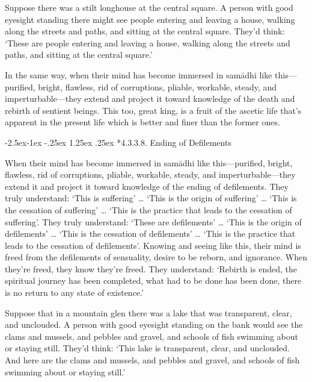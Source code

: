 \documentclass[12pt,openany]{book}%
\makeatletter
\renewcommand\paragraph{\@startsection{paragraph}{4}{\z@}%
            {-2.5ex\@plus -1ex \@minus -.25ex}%
            {1.25ex \@plus .25ex}%
            {\noindent\Semiboldnormalfont\normalsize}}
\makeatother
\begin{document}
Suppose there was a stilt longhouse at the central square. A person with good eyesight standing there might see people entering and leaving a house, walking along the streets and paths, and sitting at the central square. They’d think: ‘These are people entering and leaving a house, walking along the streets and paths, and sitting at the central square.’ 

In the same way, when their mind has become immersed in \textsanskrit{samādhi} like this—purified, bright, flawless, rid of corruptions, pliable, workable, steady, and imperturbable—they extend and project it toward knowledge of the death and rebirth of sentient beings. This too, great king, is a fruit of the ascetic life that’s apparent in the present life which is better and finer than the former ones. 

\paragraph*{4.3.3.8. Ending of Defilements }

When their mind has become immersed in \textsanskrit{samādhi} like this—purified, bright, flawless, rid of corruptions, pliable, workable, steady, and imperturbable—they extend it and project it toward knowledge of the ending of defilements. They truly understand: ‘This is suffering’ … ‘This is the origin of suffering’ … ‘This is the cessation of suffering’ … ‘This is the practice that leads to the cessation of suffering’. They truly understand: ‘These are defilements’ … ‘This is the origin of defilements’ … ‘This is the cessation of defilements’ … ‘This is the practice that leads to the cessation of defilements’. Knowing and seeing like this, their mind is freed from the defilements of sensuality, desire to be reborn, and ignorance. When they’re freed, they know they’re freed. They understand: ‘Rebirth is ended, the spiritual journey has been completed, what had to be done has been done, there is no return to any state of existence.’ 

Suppose that in a mountain glen there was a lake that was transparent, clear, and unclouded. A person with good eyesight standing on the bank would see the clams and mussels, and pebbles and gravel, and schools of fish swimming about or staying still. They’d think: ‘This lake is transparent, clear, and unclouded. And here are the clams and mussels, and pebbles and gravel, and schools of fish swimming about or staying still.’ 
\end{document}
